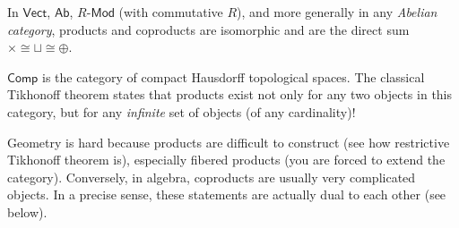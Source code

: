 \documentclass[english,letterpaper]{article}%
\numberwithin{equation}{section}
\numberwithin{figure}{section}
\numberwithin{table}{section}
\theoremstyle{definition}
\theoremstyle{definition}
\theoremstyle{definition}
\theoremstyle{plain}
\theoremstyle{plain}
\theoremstyle{plain}
\theoremstyle{plain}
\theoremstyle{remark}
\theoremstyle{remark}
\begin{document}
\begin{example}
In $\mathsf{Vect}$, $\mathsf{Ab}$, $R\text{-}\mathsf{Mod}$ (with commutative $R$), and more generally in any \emph{Abelian category}, products and coproducts are isomorphic and are the direct sum $\times\cong\sqcup\cong\oplus$.
\end{example}
%
\begin{example}
$\mathsf{Comp}$ is the category of compact Hausdorff topological
spaces. The classical Tikhonoff theorem states that products exist
not only for any two objects in this category, but for any \emph{infinite}
set of objects (of any cardinality)!
\end{example}
%
\begin{rem}
Geometry is hard because products are difficult to construct (see
how restrictive Tikhonoff theorem is), especially fibered products
(you are forced to extend the category). Conversely, in algebra, coproducts
are usually very complicated objects. In a precise sense, these statements
are actually dual to each other (see below).
\end{rem}
\end{document}
